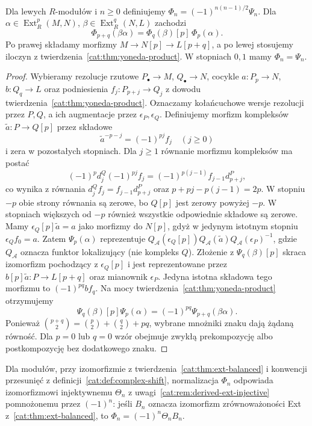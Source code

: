 \begin{twierdzenie}\label{cat:thm:derived-yoneda-product}
Dla lewych $R$-modułów i $n\ge0$ definiujemy $\Phi_n=(-1)^{n(n-1)/2}\Psi_n$. Dla $\alpha\in\operatorname{Ext}_R^p(M,N)$, $\beta\in\operatorname{Ext}_R^q(N,L)$ zachodzi
\[
 \Phi_{p+q}(\beta\alpha)=\Phi_q(\beta)[p]\,\Phi_p(\alpha).
\]
Po prawej składamy morfizmy $M\to N[p]\to L[p+q]$, a po lewej stosujemy iloczyn z twierdzenia~\ref{cat:thm:yoneda-product}. W stopniach $0,1$ mamy $\Phi_n=\Psi_n$.
\end{twierdzenie}
\begin{proof}
Wybieramy rezolucje rzutowe $P_\bullet\to M$, $Q_\bullet\to N$, cocykle $a:P_p\to N$, $b:Q_q\to L$ oraz podniesienia $f_j:P_{p+j}\to Q_j$ z dowodu twierdzenia~\ref{cat:thm:yoneda-product}. Oznaczamy kołańcuchowe wersje rezolucji przez $P,Q$, a ich augmentacje przez $\epsilon_P,\epsilon_Q$. Definiujemy morfizm kompleksów $\widetilde a:P\to Q[p]$ przez składowe
\[
 \widetilde a^{-p-j}=(-1)^{pj} f_j\quad(j\ge0)
\]
i zera w pozostałych stopniach. Dla $j\ge1$ równanie morfizmu kompleksów ma postać
\[
 (-1)^p d_j^Q(-1)^{pj}f_j
 =(-1)^{p(j-1)}f_{j-1}d_{p+j}^P,
\]
co wynika z równania $d_j^Qf_j=f_{j-1}d_{p+j}^P$ oraz $p+pj-p(j-1)=2p$. W stopniu $-p$ obie strony równania są zerowe, bo $Q[p]$ jest zerowy powyżej $-p$. W stopniach większych od $-p$ również wszystkie odpowiednie składowe są zerowe. Mamy $\epsilon_Q[p]\widetilde a=a$ jako morfizmy do $N[p]$, gdyż w jedynym istotnym stopniu $\epsilon_Q f_0=a$. Zatem $\Psi_p(\alpha)$ reprezentuje $Q_{\mathcal A}(\epsilon_Q[p])Q_{\mathcal A}(\widetilde a)Q_{\mathcal A}(\epsilon_P)^{-1}$, gdzie $Q_{\mathcal A}$ oznacza funktor lokalizujący (nie kompleks $Q$). Złożenie z $\Psi_q(\beta)[p]$ skraca izomorfizm pochodzący z $\epsilon_Q[p]$ i jest reprezentowane przez $b[p]\widetilde a:P\to L[p+q]$ oraz mianownik $\epsilon_P$. Jedyna istotna składowa tego morfizmu to $(-1)^{pq}b f_q$. Na mocy twierdzenia~\ref{cat:thm:yoneda-product} otrzymujemy
\[
 \Psi_q(\beta)[p]\Psi_p(\alpha)=(-1)^{pq}\Psi_{p+q}(\beta\alpha).
\]
Ponieważ $\binom{p+q}{2}=\binom p2+\binom q2+pq$, wybrane mnożniki znaku dają żądaną równość. Dla $p=0$ lub $q=0$ wzór obejmuje zwykłą prekompozycję albo postkompozycję bez dodatkowego znaku.
\end{proof}
\begin{stwierdzenie}\label{cat:prop:derived-ext-balance-sign}
Dla modułów, przy izomorfizmie z twierdzenia~\ref{cat:thm:ext-balanced} i konwencji przesunięć z definicji~\ref{cat:def:complex-shift}, normalizacja $\Phi_n$ odpowiada izomorfizmowi injektywnemu $\Theta_n$ z uwagi~\ref{cat:rem:derived-ext-injective} pomnożonemu przez $(-1)^n$: jeśli $B_n$ oznacza izomorfizm zrównoważoności Ext z~\ref{cat:thm:ext-balanced}, to $\Phi_n=(-1)^n\Theta_n B_n$.
\end{stwierdzenie}
